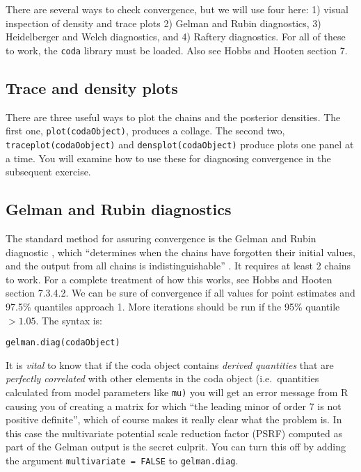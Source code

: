 \documentclass[12pt,english]{article}
\begin{document}
{There are several ways to check convergence, but we will use four here: 1) visual inspection of density and trace plots 2) Gelman and Rubin diagnostics, 3) Heidelberger and Welch diagnostics, and 4) Raftery diagnostics. For all of these to work, the \texttt{coda} library must be loaded. Also see Hobbs and Hooten \citeyearpar{hobbs2015bayesian} section 7.

\subsection{Trace and density plots}

There are three useful ways to plot the chains and the posterior densities. The first one, \texttt{plot(codaObject)}, produces a collage. The second two, \texttt{traceplot(codaOobject)} and \texttt{densplot(codaObject)} produce plots one panel at a time. You will examine how to use these for diagnosing convergence in the subsequent exercise.

\subsection{Gelman and Rubin diagnostics}

The standard method for assuring convergence is the Gelman and Rubin diagnostic \citep{Gelman_Rubin}, which \enquote{determines when the chains have forgotten their initial values, and the output from all chains is indistinguishable} \citep{R-Core-Team:2015fk}. It requires at least 2 chains to work. For a complete treatment of how this works, see Hobbs and Hooten \citeyearpar{hobbs2015bayesian} section 7.3.4.2. We can be sure of convergence if all values for point estimates and 97.5\% quantiles approach 1. More iterations should be run if the 95\% quantile $> 1.05$. The syntax is:

\begin{Verbatim}
gelman.diag(codaObject)
\end{Verbatim}

It is \emph{vital} to know that if the coda object contains \emph{derived quantities} that are \emph{perfectly correlated} with other elements in the coda object (i.e.\ quantities calculated from model parameters like \texttt{mu)} you will get an error message from R causing you of creating a matrix for which \enquote{the leading minor of order 7 is not positive definite}, which of course makes it really clear what the problem is. In this case the multivariate potential scale reduction factor (PSRF) computed as part of the Gelman output is the secret culprit. You can turn this off by adding the argument \texttt{multivariate = FALSE} to \texttt{gelman.diag}.

}
\end{document}
